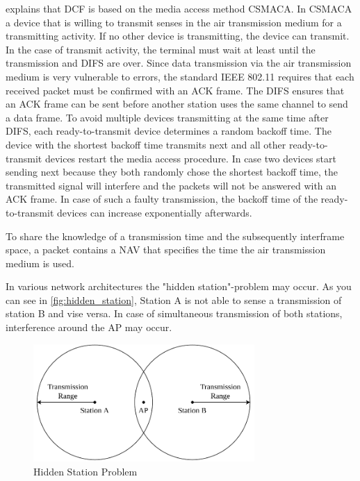 \documentclass[]{nsm-thesis}
\begin{document}
\textcite{sauter_wireless_2022} explains that \ac{DCF} is based on the media access method \ac{CSMACA}. In \ac{CSMACA} a device that is willing to transmit senses in the air transmission medium for a transmitting activity. If no other device is transmitting, the device can transmit. In the case of transmit activity, the terminal must wait at least until the transmission and \ac{DIFS} are over.
Since data transmission via the air transmission medium is very vulnerable to errors, the standard IEEE 802.11 requires that each received packet must be confirmed with an \ac{ACK} frame.
The \ac{DIFS} ensures that an \ac{ACK} frame can be sent before another station uses the same channel to send a data frame. 
To avoid multiple devices transmitting at the same time after \ac{DIFS}, each ready-to-transmit device determines a random backoff time. The device with the shortest backoff time transmits next and all other ready-to-transmit devices restart the media access procedure. In case two devices start sending next because they both randomly chose the shortest backoff time, the transmitted signal will interfere and the packets will not be answered with an \ac{ACK} frame.
In case of such a faulty transmission, the backoff time of the ready-to-transmit devices can increase exponentially afterwards.

To share the knowledge of a transmission time and the subsequently interframe space, a packet contains a \ac{NAV} that specifies the time the air transmission medium is used.

In various network architectures the "hidden station"-problem may occur. As you can see in \autoref{fig:hidden_station}, Station A is not able to sense a transmission of station B and vise versa. In case of simultaneous transmission of both stations, interference around the \ac{AP} may occur. 
\begin{figure}%
	\centering
	\includegraphics[width=0.75\textwidth]{figures/hidden_station.pdf}
	\caption{Hidden Station Problem}%
	\label{fig:hidden_station}%
\end{figure}
\end{document}

